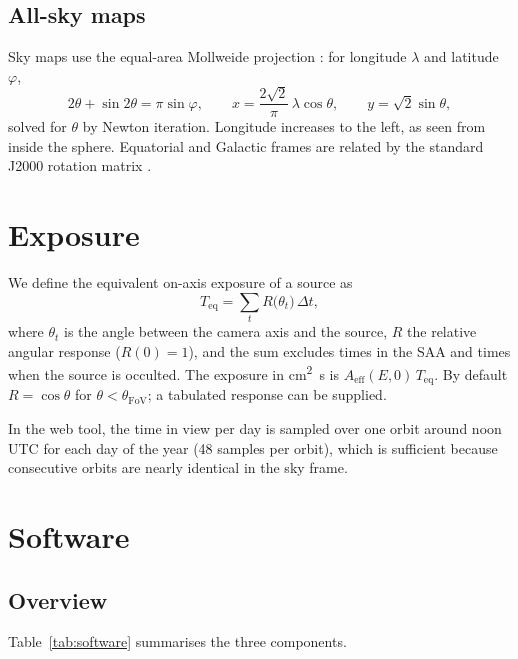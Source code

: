 \documentclass[a4paper,fleqn]{cas-sc}
\newif\ifshowtodos
\newcommand{\todo}[1]{\ifshowtodos{\color{red!70!black}\textbf{[TODO:} #1\textbf{]}}\fi}
\begin{document}
\subsection{All-sky maps}
Sky maps use the equal-area Mollweide projection \cite{Snyder1987}: for
longitude $\lambda$ and latitude $\varphi$,
\begin{equation}
  2\theta+\sin2\theta=\pi\sin\varphi,\qquad
  x=\frac{2\sqrt2}{\pi}\,\lambda\cos\theta,\qquad
  y=\sqrt2\sin\theta ,
  \label{eq:mollweide}
\end{equation}
solved for $\theta$ by Newton iteration. Longitude increases to the left, as
seen from inside the sphere. Equatorial and Galactic frames are related by the
standard J2000 rotation matrix \cite{ESA1997}.

\section{Exposure}
\label{sec:exposure}
We define the equivalent on-axis exposure of a source as
\begin{equation}
  T_{\mathrm{eq}}=\sum_t R\big(\theta_t\big)\,\Delta t ,
  \label{eq:exposure}
\end{equation}
where $\theta_t$ is the angle between the camera axis and the source, $R$ the
relative angular response ($R(0)=1$), and the sum excludes times in the SAA
and times when the source is occulted. The exposure in
\si{cm^2.s} is $A_{\mathrm{eff}}(E,0)\,T_{\mathrm{eq}}$. By default
$R=\cos\theta$ for $\theta<\theta_{\mathrm{FoV}}$; a tabulated response can be
supplied. \todo{Replace with $A_{\mathrm{eff}}(E,\theta)$ from the Geant4
simulation of the camera; discuss energy dependence and event selection.}

In the web tool, the time in view per day is sampled over one orbit around
noon UTC for each day of the year (48 samples per orbit), which is sufficient
because consecutive orbits are nearly identical in the sky frame.

\section{Software}
\label{sec:software}

\subsection{Overview}
Table~\ref{tab:software} summarises the three components. \todo{Short
paragraph on design goals: simple analytic model, few dependencies, identical
model in Python and JavaScript, reproducible figures.}
\end{document}
